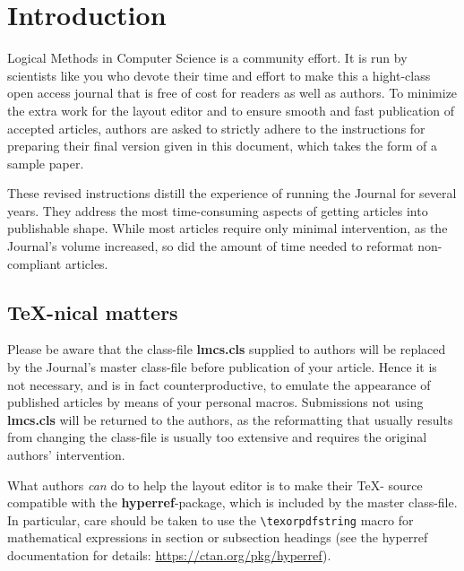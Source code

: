 \documentclass{lmcs} %
\theoremstyle{plain}\newtheorem{satz}[thm]{Satz} %
\begin{document}
\maketitle

\section*{Introduction}\label{S:one}

  Logical Methods in Computer Science is a community effort. It is run
  by scientists like you who devote their time and effort to make this
  a hight-class open access journal that is free of cost for readers
  as well as authors.  To minimize the extra work for the layout
  editor and to ensure smooth and fast publication of accepted
  articles, authors are asked to strictly adhere to the instructions
  for preparing their final version given in this document, which
  takes the form of a sample paper.

  These revised instructions distill the experience of running the
  Journal for several years.  They address the most time-consuming
  aspects of getting articles into publishable shape.  While most
  articles require only minimal intervention, as the Journal's volume
  increased, so did the amount of time needed to reformat
  non-compliant articles.

\subsection*{\TeX-nical matters}

  Please be aware that the class-file {\bf lmcs.cls} supplied to
  authors will be replaced by the Journal's master class-file before
  publication of your article.  Hence it is not necessary, and is in
  fact counterproductive, to emulate the appearance of published
  articles by means of your personal macros.  Submissions not using
  {\bf lmcs.cls} will be returned to the authors, as the reformatting
  that usually results from changing the class-file is usually too
  extensive and requires the original authors' intervention.

  What authors \emph{can} do to help the layout editor is to make
  their \TeX- source compatible with the {\bf hyperref}-package, which
  is included by the master class-file.  In particular, care should be
  taken to use the \texttt{\textbackslash texorpdfstring} macro for
  mathematical expressions in section or subsection headings (see the hyperref
  documentation for details: \url{https://ctan.org/pkg/hyperref}).
\end{document}
